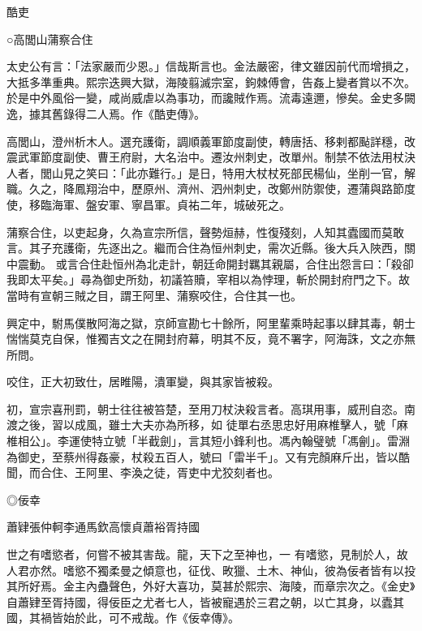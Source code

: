 
\begin{pinyinscope}

 酷吏



 ○高閭山蒲察合住



 太史公有言：「法家嚴而少恩。」信哉斯言也。金法嚴密，律文雖因前代而增損之，大抵多準重典。熙宗迭興大獄，海陵翦滅宗室，鉤棘傅會，告姦上變者賞以不次。於是中外風俗一變，咸尚威虐以為事功，而讒賊作焉。流毒遠邇，慘矣。金史多闕逸，據其舊錄得二人焉。作《酷吏傳》。



 高閭山，澄州析木人。選充護衛，調順義軍節度副使，轉唐括、移剌都颭詳穩，改震武軍節度副使、曹王府尉，大名治中。遷汝州刺史，改單州。制禁不依法用杖決人者，閭山見之笑曰：「此亦難行。」是日，特用大杖杖死部民楊仙，坐削一官，解職。久之，降鳳翔治中，歷原州、濟州、泗州刺史，改鄭州防禦使，遷蒲與路節度使，移臨海軍、盤安軍、寧昌軍。貞祐二年，城破死之。



 蒲察合住，以吏起身，久為宣宗所信，聲勢烜赫，性復殘刻，人知其蠹國而莫敢言。其子充護衛，先逐出之。繼而合住為恒州刺史，需次近縣。後大兵入陜西，關中震動。
 或言合住赴恒州為北走計，朝廷命開封羈其親屬，合住出怨言曰：「殺卻我即太平矣。」尋為御史所劾，初議笞贖，宰相以為悖理，斬於開封府門之下。故當時有宣朝三賊之目，謂王阿里、蒲察咬住，合住其一也。



 興定中，駙馬僕散阿海之獄，京師宣勘七十餘所，阿里輩乘時起事以肆其毒，朝士惴惴莫克自保，惟獨吉文之在開封府幕，明其不反，竟不署字，阿海誅，文之亦無所問。



 咬住，正大初致仕，居睢陽，潰軍變，與其家皆被殺。



 初，宣宗喜刑罰，朝士往往被笞楚，至用刀杖決殺言者。高琪用事，威刑自恣。南渡之後，習以成風，雖士大夫亦為所移，如
 徒單右丞思忠好用麻椎擊人，號「麻椎相公」。李運使特立號「半截劍」，言其短小鋒利也。馮內翰璧號「馮劊」。雷淵為御史，至蔡州得姦豪，杖殺五百人，號曰「雷半千」。又有完顏麻斤出，皆以酷聞，而合住、王阿里、李渙之徒，胥吏中尤狡刻者也。



 ◎佞幸



 蕭肄張仲軻李通馬欽高懷貞蕭裕胥持國



 世之有嗜慾者，何嘗不被其害哉。龍，天下之至神也，一
 有嗜慾，見制於人，故人君亦然。嗜慾不獨柔曼之傾意也，征伐、畋獵、土木、神仙，彼為佞者皆有以投其所好焉。金主內蠱聲色，外好大喜功，莫甚於熙宗、海陵，而章宗次之。《金史》自蕭肄至胥持國，得佞臣之尤者七人，皆被寵遇於三君之朝，以亡其身，以蠹其國，其禍皆始於此，可不戒哉。作《佞幸傳》。




\end{pinyinscope}

